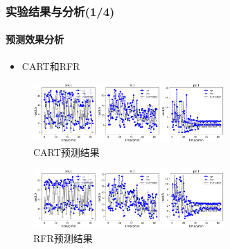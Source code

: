 \begin{frame}
\frametitle{实验结果与分析(1/4)}
\framesubtitle{预测效果分析}
\begin{itemize}
    \item CART和RFR
\end{itemize}
\begin{minipage}{\textwidth}
    \centering
    \begin{figure}[htb]
    \centering
    \includegraphics[width=0.65\textwidth]{figures/fig12_d_cart.png}
    \caption{CART预测结果}
    \label{fig:fig12_d}
    \end{figure}
\end{minipage}
\begin{minipage}{\textwidth}
    \centering
    \begin{figure}[htb]
    \centering
    \includegraphics[width=0.65\textwidth]{figures/fig12_e_rfr.png}
    \caption{RFR预测结果}
    \label{fig:fig12_e}
    \end{figure}
\end{minipage}
\end{frame}

